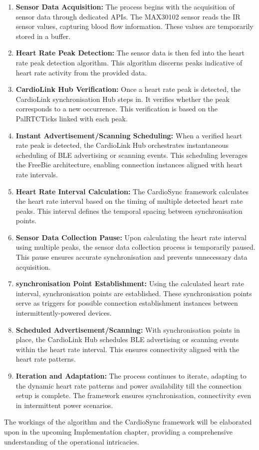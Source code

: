 \begin{enumerate}
    \item \textbf{Sensor Data Acquisition:} The process begins with the acquisition of sensor data through dedicated APIs. The MAX30102 sensor reads the IR sensor values, capturing blood flow information. These values are temporarily stored in a buffer.
    
    \item \textbf{Heart Rate Peak Detection:} The sensor data is then fed into the heart rate peak detection algorithm. This algorithm discerns peaks indicative of heart rate activity from the provided data.
    
    \item \textbf{CardioLink Hub Verification:} Once a heart rate peak is detected, the CardioLink synchronisation Hub steps in. It verifies whether the peak corresponds to a new occurrence. This verification is based on the PalRTCTicks linked with each peak.
    
    \item \textbf{Instant Advertisement/Scanning Scheduling:} When a verified heart rate peak is detected, the CardioLink Hub orchestrates instantaneous scheduling of BLE advertising or scanning events. This scheduling leverages the FreeBie architecture, enabling connection instances aligned with heart rate intervals.
    
    \item \textbf{Heart Rate Interval Calculation:} The CardioSync framework calculates the heart rate interval based on the timing of multiple detected heart rate peaks. This interval defines the temporal spacing between synchronisation points.
    
    \item \textbf{Sensor Data Collection Pause:} Upon calculating the heart rate interval using multiple peaks, the sensor data collection process is temporarily paused. This pause ensures accurate synchronisation and prevents unnecessary data acquisition.
    
    \item \textbf{synchronisation Point Establishment:} Using the calculated heart rate interval, synchronisation points are established. These synchronisation points serve as triggers for possible connection establishment instances between intermittently-powered devices.
    
    \item \textbf{Scheduled Advertisement/Scanning:} With synchronisation points in place, the CardioLink Hub schedules BLE advertising or scanning events within the heart rate interval. This ensures connectivity aligned with the heart rate patterns.
    
    \item \textbf{Iteration and Adaptation:} The process continues to iterate, adapting to the dynamic heart rate patterns and power availability till the connection setup is complete. The framework ensures synchronisation, connectivity even in intermittent power scenarios.
\end{enumerate}

\noindent The workings of the algorithm and the CardioSync framework will be elaborated upon in the upcoming Implementation chapter, providing a comprehensive understanding of the operational intricacies.
